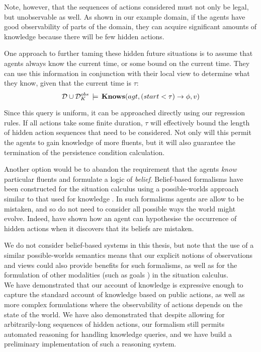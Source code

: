 Note, however, that the sequences of actions considered must not only
be legal, but unobservable as well. As shown in our example domain,
if the agents have good observability of parts of the domain, they
can acquire significant amounts of knowledge because there will be
few hidden actions.

One approach to further taming these hidden future situations is to
assume that agents always know the current time, or some bound on
the current time. They can use this information in conjunction with
their local view to determine what they know, given that the current
time is $\tau$:\[
\mathcal{D}\cup\mathcal{D}_{K}^{obs}\,\models\,\mathbf{Knows}(agt,(start<\tau)\rightarrow\phi,v)\]


Since this query is uniform, it can be approached directly using our
regression rules. If all actions take some finite duration, $\tau$
will effectively bound the length of hidden action sequences that
need to be considered. Not only will this permit the agents to gain
knowledge of more fluents, but it will also guarantee the termination
of the persistence condition calculation.

Another option would be to abandon the requirement that the agents
\emph{know} particular fluents and formulate a logic of \emph{belief}.
Belief-based formalisms have been constructed for the situation calculus
using a possible-worlds approach similar to that used for knowledge
\citep{shapiro00sc_belief}. In such formalisms agents are allow to
be mistaken, and so do not need to consider all possible ways the
world might evolve. Indeed, \citet{shapiro04sc_belief_exog} have
shown how an agent can hypothesise the occurrence of hidden actions
when it discovers that its beliefs are mistaken.

We do not consider belief-based systems in this thesis, but note that
the use of a similar possible-worlds semantics means that our explicit
notions of observations and views could also provide benefits for
such formalisms, as well as for the formulation of other modalities
(such as goals \citep{shapiro07sc_goal_change}) in the situation
calculus.\\


We have demonstrated that our account of knowledge is expressive enough
to capture the standard account of knowledge based on public actions,
as well as more complex formulations where the observability of actions
depends on the state of the world. We have also demonstrated that
despite allowing for arbitrarily-long sequences of hidden actions,
our formalism still permits automated reasoning for handling knowledge
queries, and we have build a preliminary implementation of such a
reasoning system.

